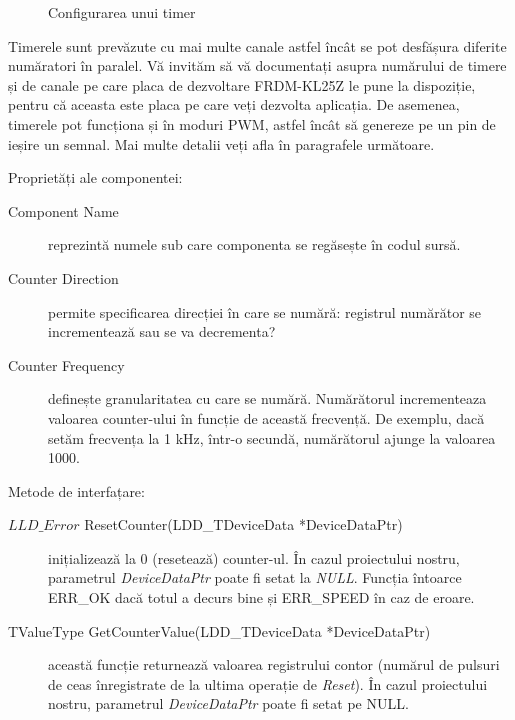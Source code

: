 \begin{figure}
    \vspace{-30pt}
    \vspace{-20pt}
    \caption{\label{fig:CodeWarrior-Timer} Configurarea unui timer}
    \vspace{-10pt}
\end{figure}

Timerele sunt prevăzute cu mai multe canale astfel încât se pot desfășura diferite număratori în paralel. Vă invităm să vă documentați asupra numărului de timere și de canale pe care placa de dezvoltare FRDM-KL25Z le pune la dispoziție, pentru că aceasta este placa pe care veți dezvolta aplicația. De asemenea, timerele pot funcționa și în moduri PWM, astfel încât să genereze pe un pin de ieșire un semnal. Mai multe detalii veți afla în paragrafele următoare.

Proprietăți ale componentei:

\begin{description}
    \item[Component Name] reprezintă numele sub care componenta se regăsește în codul sursă.
    \item[Counter Direction] permite specificarea direcției în care se numără: registrul numărător se incrementează sau se va decrementa?
    \item[Counter Frequency] definește granularitatea cu care se numără. Numărătorul incrementeaza valoarea counter-ului în funcție de această frecvență. De exemplu, dacă setăm frecvența la 1 kHz, într-o secundă, numărătorul ajunge la valoarea 1000. 
\end{description}

Metode de interfațare:

\begin{description}
    \item[$LLD\_Error$ ResetCounter(LDD\_TDeviceData *DeviceDataPtr)] inițializează la 0 (resetează) counter-ul. În cazul proiectului nostru, parametrul \textit{DeviceDataPtr} poate fi setat la \textit{NULL}. Funcția întoarce ERR\_OK dacă totul a decurs bine și ERR\_SPEED în caz de eroare. 
    \item[TValueType GetCounterValue(LDD\_TDeviceData *DeviceDataPtr)] această funcție returnează valoarea registrului contor (numărul de pulsuri de ceas înregistrate de la ultima operație de \textit{Reset}). În cazul proiectului nostru, parametrul \textit{DeviceDataPtr} poate fi setat pe NULL.
\end{description}


